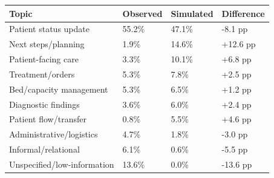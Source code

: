 \begin{tabular}{llll}
\toprule
\textbf{Topic} & \textbf{Observed} & \textbf{Simulated} & \textbf{Difference} \\
\midrule
Patient status update & 55.2\% & 47.1\% & -8.1 pp \\
Next steps/planning & 1.9\% & 14.6\% & +12.6 pp \\
Patient-facing care & 3.3\% & 10.1\% & +6.8 pp \\
Treatment/orders & 5.3\% & 7.8\% & +2.5 pp \\
Bed/capacity management & 5.3\% & 6.5\% & +1.2 pp \\
Diagnostic findings & 3.6\% & 6.0\% & +2.4 pp \\
Patient flow/transfer & 0.8\% & 5.5\% & +4.6 pp \\
Administrative/logistics & 4.7\% & 1.8\% & -3.0 pp \\
Informal/relational & 6.1\% & 0.6\% & -5.5 pp \\
Unspecified/low-information & 13.6\% & 0.0\% & -13.6 pp \\
\bottomrule
\end{tabular}
